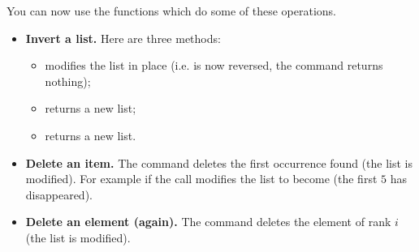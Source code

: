 \documentclass[11pt,class=report,crop=false]{standalone}
\begin{document}
\begin{cours}
  You can now use the \Python{} functions which do some of these operations.
  
\begin{itemize}
  \item \textbf{Invert a list.} Here are three methods: 
\begin{itemize}
  \item {} modifies the list in place (i.e.  is now reversed, the command returns nothing);
  \item {} returns a new list;
  \item {} returns a new list. 
\end{itemize}  

  \item \textbf{Delete an item.}  The command  deletes the first occurrence found (the list is modified). For example if  the call  modifies the list to become \ci{[2,3,8,5]} (the first $5$ has disappeared).
  
   \item \textbf{Delete an element (again).}  The command  deletes the element of rank $i$ (the list is modified).
  
\end{itemize}
\end{cours}



\end{document}
